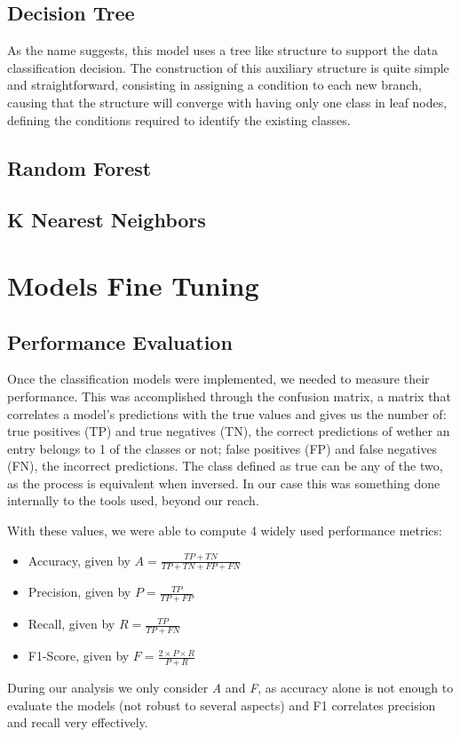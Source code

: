 \documentclass[conference]{IEEEtran}
\begin{document}
\subsection{Decision Tree}
As the name suggests, this model uses a tree like structure to support the data classification decision. The construction of this auxiliary structure is quite simple and straightforward, consisting in assigning a condition to each new branch, causing that the structure will converge with having only one class in leaf nodes, defining the conditions required to identify the existing classes. 

\subsection{Random Forest}

\subsection{K Nearest Neighbors}

\section{Models Fine Tuning}

\subsection{Performance Evaluation}

Once the classification models were implemented, we needed to measure their 
performance.
This was accomplished through the confusion matrix, a matrix that correlates 
a model's predictions with the true values and gives us the number of: true 
positives (TP) and true negatives (TN), the correct predictions of wether an 
entry belongs to 1 of the classes or not; false positives (FP) and false negatives (FN), the 
incorrect predictions.
The class defined as true can be any of the two, as the process is equivalent 
when inversed.
In our case this was something done internally to the tools used, beyond our 
reach.

With these values, we were able to compute 4 widely used performance metrics:
\begin{itemize}
\item Accuracy, given by $A = \frac{TP + TN}{TP + TN + FP + FN}$
\vspace{3pt}
\item Precision, given by $P = \frac{TP}{TP + FP}$
\vspace{3pt}
\item Recall, given by $R = \frac{TP}{TP + FN}$
\vspace{3pt}
\item F1-Score, given by $F = \frac{2 \times P \times R}{P + R}$
\vspace{3pt}
\end{itemize}
During our analysis we only consider \textit{A} and \textit{F}, as accuracy alone 
is not enough to evaluate the models (not robust to several aspects) and F1 
correlates precision and recall very effectively.
\end{document}
